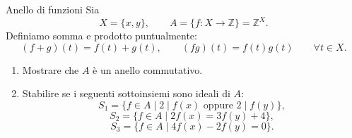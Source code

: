 \documentclass[a4paper]{article}
\begin{document}
\begin{radioactive}
\begin{snippetexercise}{Anello di funzioni}
    Sia
    \[
        X=\{x,y\},
        \qquad
        A=\{f\colon X\to\mathbb{Z}\}=\mathbb{Z}^X.
    \]
    Definiamo somma e prodotto puntualmente:
    \[
        (f+g)(t)=f(t)+g(t),
        \qquad
        (fg)(t)=f(t)g(t)
        \qquad
        \forall t\in X.
    \]

    \begin{enumerate}
        \item Mostrare che \(A\) è un anello commutativo.
        \item Stabilire se i seguenti sottoinsiemi sono ideali di \(A\):
        \[
            S_1=\{f\in A\mid 2\mid f(x) \text{ oppure } 2\mid f(y)\},
        \]
        \[
            S_2=\{f\in A\mid 2f(x)=3f(y)+4\},
        \]
        \[
            S_3=\{f\in A\mid 4f(x)-2f(y)=0\}.
        \]
    \end{enumerate}
\end{snippetexercise}
\end{radioactive}
\end{document}
